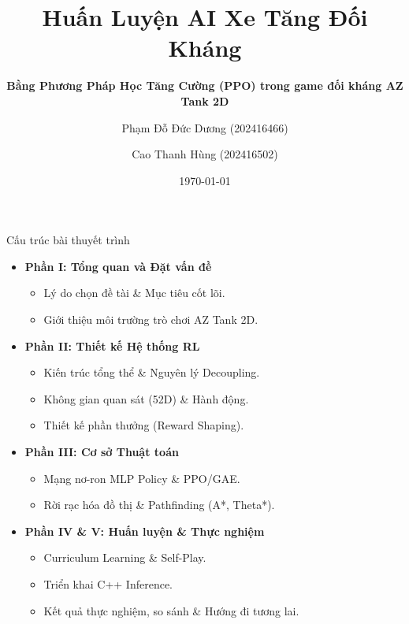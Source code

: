 \documentclass[aspectratio=169]{beamer}
\title{Huấn Luyện AI Xe Tăng Đối Kháng}
\subtitle{\textbf{Bằng Phương Pháp Học Tăng Cường (PPO) trong game đối kháng AZ Tank 2D}}
\author{Phạm Đỗ Đức Dương (202416466) \and Cao Thanh Hùng (202416502)}
\institute{Đại học Bách khoa Hà Nội}
\date{\today}
\begin{document}
\begin{frame}
	\maketitle
\end{frame}

\begin{frame}{Cấu trúc bài thuyết trình}
  \begin{itemize}
    \item \textbf{\color{hustred}Phần I: Tổng quan và Đặt vấn đề}
      \begin{itemize}
        \item Lý do chọn đề tài \& Mục tiêu cốt lõi.
        \item Giới thiệu môi trường trò chơi AZ Tank 2D.
      \end{itemize}
    \vspace{0.4em}
    \item \textbf{\color{hustred}Phần II: Thiết kế Hệ thống RL}
      \begin{itemize}
        \item Kiến trúc tổng thể \& Nguyên lý Decoupling.
        \item Không gian quan sát (52D) \& Hành động.
        \item Thiết kế phần thưởng (Reward Shaping).
      \end{itemize}
    \vspace{0.4em}
    \item \textbf{\color{hustred}Phần III: Cơ sở Thuật toán}
      \begin{itemize}
        \item Mạng nơ-ron MLP Policy \& PPO/GAE.
        \item Rời rạc hóa đồ thị \& Pathfinding (A*, Theta*).
      \end{itemize}
    \vspace{0.4em}
    \item \textbf{\color{hustred}Phần IV \& V: Huấn luyện \& Thực nghiệm}
      \begin{itemize}
        \item Curriculum Learning \& Self-Play.
        \item Triển khai C++ Inference.
        \item Kết quả thực nghiệm, so sánh \& Hướng đi tương lai.
      \end{itemize}
  \end{itemize}
\end{frame}
\end{document}
